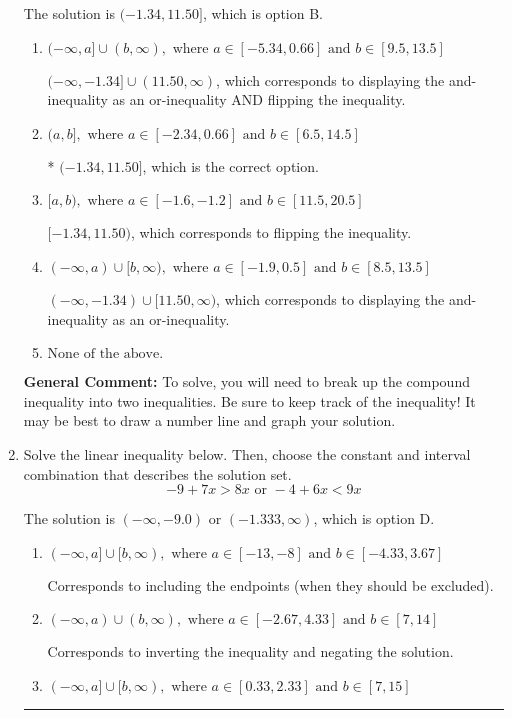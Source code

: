 \documentclass{extbook}[14pt]
\newcommand{\litem}[1]{\item #1

\rule{\textwidth}{0.4pt}}
\begin{document}
\begin{enumerate}
{The solution is \( (-1.34, 11.50] \), which is option B.\begin{enumerate}[label=\Alph*.]
\item \( (-\infty, a] \cup (b, \infty), \text{ where } a \in [-5.34, 0.66] \text{ and } b \in [9.5, 13.5] \)

$(-\infty, -1.34] \cup (11.50, \infty)$, which corresponds to displaying the and-inequality as an or-inequality AND flipping the inequality.
\item \( (a, b], \text{ where } a \in [-2.34, 0.66] \text{ and } b \in [6.5, 14.5] \)

* $(-1.34, 11.50]$, which is the correct option.
\item \( [a, b), \text{ where } a \in [-1.6, -1.2] \text{ and } b \in [11.5, 20.5] \)

$[-1.34, 11.50)$, which corresponds to flipping the inequality.
\item \( (-\infty, a) \cup [b, \infty), \text{ where } a \in [-1.9, 0.5] \text{ and } b \in [8.5, 13.5] \)

$(-\infty, -1.34) \cup [11.50, \infty)$, which corresponds to displaying the and-inequality as an or-inequality.
\item \( \text{None of the above.} \)


\end{enumerate}

\textbf{General Comment:} To solve, you will need to break up the compound inequality into two inequalities. Be sure to keep track of the inequality! It may be best to draw a number line and graph your solution.
}
\litem{
Solve the linear inequality below. Then, choose the constant and interval combination that describes the solution set.
\[ -9 + 7 x > 8 x \text{ or } -4 + 6 x < 9 x \]

The solution is \( (-\infty, -9.0) \text{ or } (-1.333, \infty) \), which is option D.\begin{enumerate}[label=\Alph*.]
\item \( (-\infty, a] \cup [b, \infty), \text{ where } a \in [-13, -8] \text{ and } b \in [-4.33, 3.67] \)

Corresponds to including the endpoints (when they should be excluded).
\item \( (-\infty, a) \cup (b, \infty), \text{ where } a \in [-2.67, 4.33] \text{ and } b \in [7, 14] \)

Corresponds to inverting the inequality and negating the solution.
\item \( (-\infty, a] \cup [b, \infty), \text{ where } a \in [0.33, 2.33] \text{ and } b \in [7, 15] \)


\end{enumerate}}
\end{enumerate}
\end{document}
